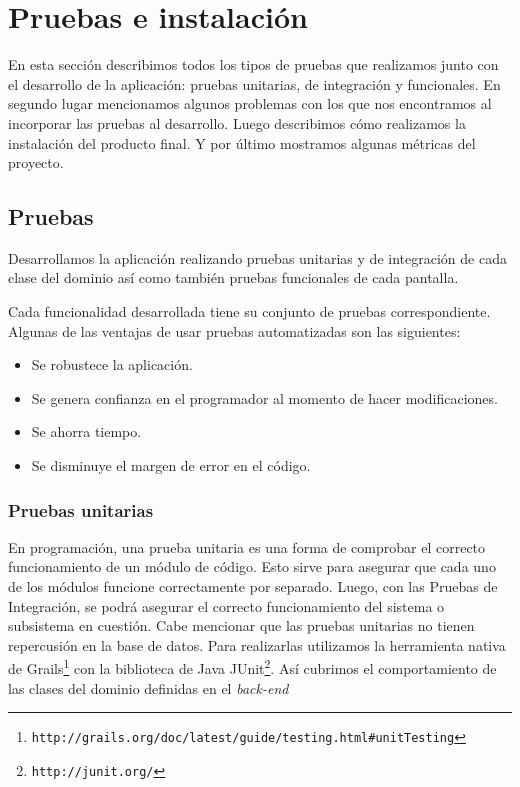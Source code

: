 \section{Pruebas e instalación}
En esta sección describimos todos los tipos de pruebas que realizamos junto con el desarrollo de la aplicación: pruebas unitarias, de integración y funcionales. En segundo lugar mencionamos algunos problemas con los que nos encontramos al incorporar las pruebas al desarrollo. Luego describimos cómo realizamos la instalación del producto final. Y por último mostramos algunas métricas del proyecto.

\subsection{Pruebas}
Desarrollamos la aplicación realizando pruebas unitarias y de integración de cada clase del dominio así como también pruebas funcionales de cada pantalla.

Cada funcionalidad desarrollada tiene su conjunto de pruebas correspondiente. Algunas de las ventajas de usar pruebas automatizadas son las siguientes:

\begin{itemize}
\item Se robustece la aplicación.
\item Se genera confianza en el programador al momento de hacer modificaciones.
\item Se ahorra tiempo.
\item Se disminuye el margen de error en el código.
\end{itemize}

\subsubsection{Pruebas unitarias}
En programación, una prueba unitaria es una forma de comprobar el correcto funcionamiento de un módulo de código. Esto sirve para asegurar que cada uno de los módulos funcione correctamente por separado. Luego, con las Pruebas de Integración, se podrá asegurar el correcto funcionamiento del sistema o subsistema en cuestión. Cabe mencionar que las pruebas unitarias no tienen repercusión en la base de datos. Para realizarlas utilizamos la herramienta nativa de Grails\footnote{\texttt{http://grails.org/doc/latest/guide/testing.html\#unitTesting}} con la biblioteca de Java JUnit\footnote{\texttt{http://junit.org/}}. Así cubrimos el comportamiento de las clases del dominio definidas en el \textit{back-end}

